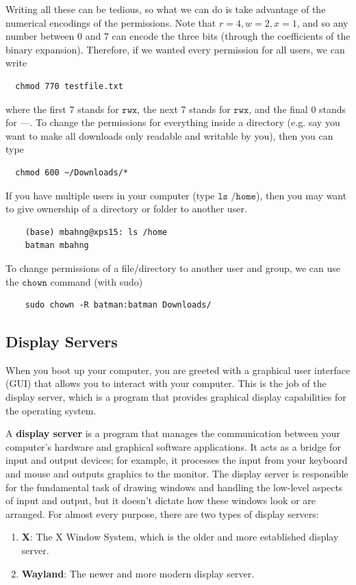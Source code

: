   Writing all these can be tedious, so what we can do is take advantage of the numerical encodings of the permissions. Note that $r=4, w=2, x=1$, and so any number between $0$ and $7$ can encode the three bits (through the coefficients of the binary expansion). Therefore, if we wanted every permission for all users, we can write 
  \begin{lstlisting}
  chmod 770 testfile.txt
  \end{lstlisting}
  where the first 7 stands for $\texttt{rwx}$, the next 7 stands for $\texttt{rwx}$, and the final $0$ stands for $\texttt{---}$. To change the permissions for everything inside a directory (e.g. say you want to make all downloads only readable and writable by you), then you can type 
  \begin{lstlisting}
  chmod 600 ~/Downloads/*
  \end{lstlisting}

  If you have multiple users in your computer (type $\texttt{ls /home}$), then you may want to give ownership of a directory or folder to another user. 
  \begin{lstlisting}
    (base) mbahng@xps15: ls /home
    batman mbahng
  \end{lstlisting}
  To change permissions of a file/directory to another user and group, we can use the $\texttt{chown}$ command (with sudo) 
  \begin{lstlisting}
    sudo chown -R batman:batman Downloads/
  \end{lstlisting}

\subsection{Display Servers}

  When you boot up your computer, you are greeted with a graphical user interface (GUI) that allows you to interact with your computer. This is the job of the display server, which is a program that provides graphical display capabilities for the operating system. 

  \begin{definition}
    \label{def:display-server}
    A \textbf{display server} is a program that manages the communication between your computer's hardware and graphical software applications. It acts as a bridge for input and output devices; for example, it processes the input from your keyboard and mouse and outputs graphics to the monitor. The display server is responsible for the fundamental task of drawing windows and handling the low-level aspects of input and output, but it doesn't dictate how these windows look or are arranged. For almost every purpose, there are two types of display servers: 
    \begin{enumerate} 
      \item \textbf{X}: The X Window System, which is the older and more established display server. 
      \item \textbf{Wayland}: The newer and more modern display server.
    \end{enumerate}
  \end{definition}

